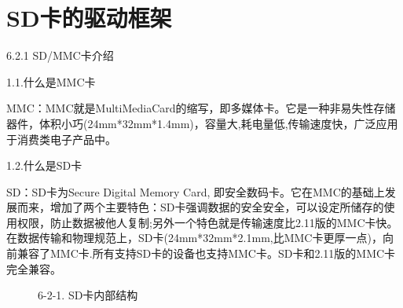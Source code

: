 \section{SD卡的驱动框架}
6.2.1 SD/MMC卡介绍

1.1.什么是MMC卡

MMC：MMC就是MultiMediaCard的缩写，即多媒体卡。它是一种非易失性存储器件，体积小巧(24mm*32mm*1.4mm)，容量大,耗电量低,传输速度快，广泛应用于消费类电子产品中。

1.2.什么是SD卡

SD：SD卡为Secure Digital Memory Card, 即安全数码卡。它在MMC的基础上发展而来，增加了两个主要特色：SD卡强调数据的安全安全，可以设定所储存的使用权限，防止数据被他人复制;另外一个特色就是传输速度比2.11版的MMC卡快。在数据传输和物理规范上，SD卡(24mm*32mm*2.1mm,比MMC卡更厚一点)，向前兼容了MMC卡.所有支持SD卡的设备也支持MMC卡。SD卡和2.11版的MMC卡完全兼容。
\begin{figure}[H]
    \centering
    \caption{6-2-1. SD卡内部结构}
\end{figure}

